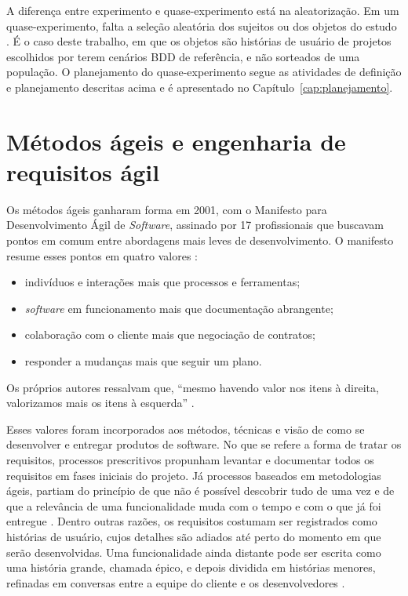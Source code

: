 A diferença entre experimento e quase-experimento está na aleatorização. Em um quase-experimento, falta a seleção aleatória dos sujeitos ou dos objetos do estudo \cite{wohlin2000}. É o caso deste trabalho, em que os objetos são histórias de usuário de projetos escolhidos por terem cenários BDD de referência, e não sorteados de uma população. O planejamento do quase-experimento segue as atividades de definição e planejamento descritas acima e é apresentado no Capítulo~\ref{cap:planejamento}.

\section{Métodos ágeis e engenharia de requisitos ágil}
\label{sec:ageis}

Os métodos ágeis ganharam forma em 2001, com o Manifesto para Desenvolvimento Ágil de \textit{Software}, assinado por 17 profissionais que buscavam pontos em comum entre abordagens mais leves de desenvolvimento. O manifesto resume esses pontos em quatro valores \cite[não paginado]{beck2001}:

\begin{itemize}
  \item indivíduos e interações mais que processos e ferramentas;
  \item \textit{software} em funcionamento mais que documentação abrangente;
  \item colaboração com o cliente mais que negociação de contratos;
  \item responder a mudanças mais que seguir um plano.
\end{itemize}

Os próprios autores ressalvam que, ``mesmo havendo valor nos itens à direita, valorizamos mais os itens à esquerda'' \cite[não paginado]{beck2001}.

Esses valores foram incorporados aos métodos, técnicas e visão de como se desenvolver e entregar produtos de software. No que se refere a forma de tratar os requisitos, processos prescritivos propunham levantar e documentar todos os requisitos em fases iniciais do projeto.
Já processos baseados em metodologias ágeis, partiam do princípio de que não é possível descobrir tudo de uma vez e de que a relevância de uma funcionalidade muda com o tempo e com o que já foi entregue \cite{cohn2004}. Dentro outras razões, os requisitos costumam ser registrados como histórias de usuário, cujos detalhes são adiados até perto do momento em que serão desenvolvidas. Uma funcionalidade ainda distante pode ser escrita como uma história grande, chamada épico, e depois dividida em histórias menores, refinadas em conversas entre a equipe do cliente e os desenvolvedores \cite{cohn2004}.


